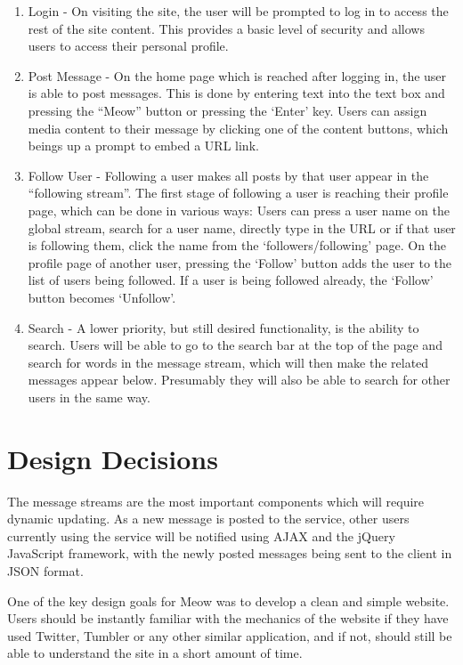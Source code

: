 \documentclass{sig-alt-release2}
\begin{document}
\begin{enumerate}

\item Login - On visiting the site, the user will be prompted to log in to access the rest of the site content. This provides a basic level of security and allows users to access their personal profile.

\item Post Message - On the home page which is reached after logging in, the user is able to post messages. This is done by entering text into the text box and pressing the ``Meow'' button or pressing the `Enter' key. Users can assign media content to their message by clicking one of the content buttons, which beings up a prompt to embed a URL link.

\item Follow User - Following a user makes all posts by that user appear in the ``following stream''. The first stage of following a user is reaching their profile page, which can be done in various ways: Users can press a user name on the global stream, search for a user name, directly type in the URL or if that user is following them, click the name from the `followers/following' page. On the profile page of another user, pressing the `Follow' button adds the user to the list of users being followed. If a user is being followed already, the `Follow' button becomes `Unfollow'.

\item Search - A lower priority, but still desired functionality, is the ability to search. Users will be able to go to the search bar at the top of the page and search for words in the message stream, which will then make the related messages appear below. Presumably they will also be able to search for other users in the same way.

\end{enumerate}

\section{Design Decisions}

The message streams are the most important components which will require dynamic updating. As a new message is posted to the service, other users currently using the service will be notified using AJAX and the jQuery JavaScript framework, with the newly posted messages being sent to the client in JSON format.

One of the key design goals for Meow was to develop a clean and simple website. Users should be instantly familiar with the mechanics of the website if they have used Twitter, Tumbler or any other similar application, and if not, should still be able to understand the site in a short amount of time.
\end{document}
